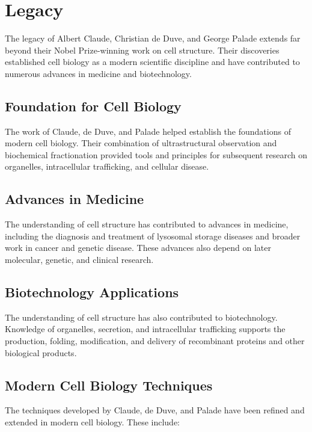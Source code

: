 \section{Legacy}

The legacy of Albert Claude, Christian de Duve, and George Palade extends far beyond their Nobel Prize-winning work on cell structure. Their discoveries established cell biology as a modern scientific discipline and have contributed to numerous advances in medicine and biotechnology.

\subsection{Foundation for Cell Biology}

The work of Claude, de Duve, and Palade helped establish the foundations of modern cell biology. Their combination of ultrastructural observation and biochemical fractionation provided tools and principles for subsequent research on organelles, intracellular trafficking, and cellular disease.

\subsection{Advances in Medicine}

The understanding of cell structure has contributed to advances in medicine, including the diagnosis and treatment of lysosomal storage diseases and broader work in cancer and genetic disease. These advances also depend on later molecular, genetic, and clinical research.

\subsection{Biotechnology Applications}

The understanding of cell structure has also contributed to biotechnology. Knowledge of organelles, secretion, and intracellular trafficking supports the production, folding, modification, and delivery of recombinant proteins and other biological products.

\subsection{Modern Cell Biology Techniques}

The techniques developed by Claude, de Duve, and Palade have been refined and extended in modern cell biology. These include:

